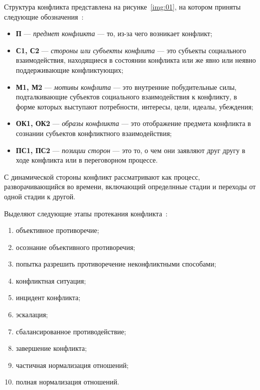 Структура конфликта представлена на рисунке~\ref{img:01}, на котором
приняты следующие обозначения~\cite{book03}:
\begin{itemize}
    \item \textbf{П} --- \textit{предмет конфликта} --- то, из-за чего возникает
        конфликт;
    \item \textbf{С1, С2} --- \textit{стороны или субъекты конфлита} ---
        это субъекты социального взаимодействия, находящиеся в
        состоянии конфликта или же явно или неявно поддерживающие
        конфликтующих;
    \item \textbf{М1, М2} --- \textit{мотивы конфлита} --- это внутренние
        побудительные силы, подталкивающие субъектов социального взаимодействия
        к конфликту, в форме которых выступают потребности, интересы,
        цели, идеалы, убеждения;
    \item \textbf{ОК1, ОК2} --- \textit{образы конфликта} --- это
        отображение предмета конфликта в сознании субъектов конфликтного
        взаимодействия;
    \item \textbf{ПС1, ПС2} --- \textit{позиции сторон} --- это то,
        о чем они заявляют друг другу в ходе конфликта или в переговорном
        процессе.
\end{itemize}


С динамической стороны конфликт рассматривают как процесс,
разворачивающийся во времени, включающий определнные стадии и переходы от
одной стадии к другой.

Выделяют следующие этапы протекания конфликта~\cite{art01}:

\begin{enumerate}[label=\arabic*)]
    \item объективное противоречие;
    \item осознание объективного противоречия;
    \item попытка разрешить противоречение неконфликтными способами;
    \item конфликтная ситуация;
    \item инцидент конфликта;
    \item эскалация;
    \item сбалансированное противодействие;
    \item завершение конфликта;
    \item частичная нормализация отношений;
    \item полная нормализация отношений.
\end{enumerate}

